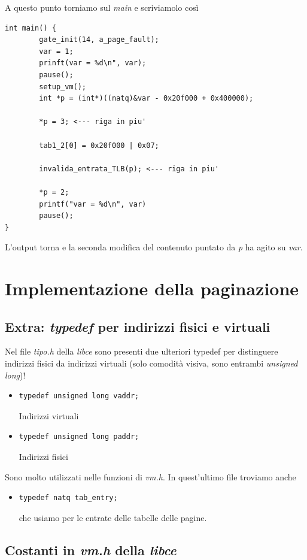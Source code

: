 \documentclass[11pt]{report}
\theoremstyle{definition}
\begin{document}
A questo punto torniamo sul \emph{main} e scriviamolo così
\begin{verbatim}
int main() {
    	gate_init(14, a_page_fault);
    	var = 1;
    	prinft(var = %d\n", var);
    	pause();
    	setup_vm();
    	int *p = (int*)((natq)&var - 0x20f000 + 0x400000);
    	
    	*p = 3; <--- riga in piu'
    	
    	tab1_2[0] = 0x20f000 | 0x07;
    	
    	invalida_entrata_TLB(p); <--- riga in piu'
    	
    	*p = 2;
    	printf("var = %d\n", var)
    	pause();
}
\end{verbatim}
	L'output torna e la seconda modifica del contenuto puntato da \emph{p} ha agito su \emph{var}.




\chapter{Implementazione della paginazione}

\section{Extra: \emph{typedef} per indirizzi fisici e virtuali} Nel file \emph{tipo.h} della \emph{libce} sono presenti due ulteriori typedef per distinguere indirizzi fisici da indirizzi virtuali (solo comodità visiva, sono entrambi \emph{unsigned long})!
\begin{itemize}
	\item \begin{verbatim}typedef unsigned long vaddr;\end{verbatim}
	Indirizzi virtuali
	\item \begin{verbatim}typedef unsigned long paddr;\end{verbatim}
	Indirizzi fisici
\end{itemize}
Sono molto utilizzati nelle funzioni di \emph{vm.h}. In quest'ultimo file troviamo anche 
\begin{itemize}
	\item \begin{verbatim}typedef natq tab_entry;
	\end{verbatim}
	che usiamo per le entrate delle tabelle delle pagine.
\end{itemize} 
\section{Costanti in \emph{vm.h} della \emph{libce}}
\end{document}
